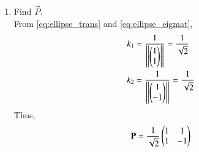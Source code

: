 \documentclass[journal,12pt,twocolumn]{IEEEtran}
\renewcommand\thesection{\arabic{section}}
\begin{document}
\begin{enumerate}[label=\thesection.\arabic*
,ref=\thesection.\theenumi]
\\
\solution From \eqref{eq:ellipse_eig}
\begin{align}
V\vec{P}_1 &= \lambda_1 \vec{P}_1
\\
\implies \brak{V-\lambda I} \vec{y}&= 0
\\
\implies \myvec{1 & -1} \vec{P}_1&= 0
\\
\text{or, } \vec{P}_1 = k_1 \myvec{1 \\ 1}
\label{eq:ellipsen1}
\end{align}
%
Similarly, 
%
\begin{align}
\myvec{1 &  1}\vec{P}_2&= 0
\\
\text{or, } \vec{P}_2 = k_2 \myvec{1 \\ -1}
\end{align}
%
\item Find $\vec{P}$.
\\
\solution From \eqref{eq:ellipse_trans} and \eqref{eq:ellipse_eigmat},
\begin{align}
k_1 &=  \frac{1}{\left\lVert\begin{pmatrix}1 \\ 1\end{pmatrix}\right\rVert} = \frac{1}{\sqrt{2}}
\\
k_2 &=  \frac{1}{\left\lVert\begin{pmatrix}1 \\ -1\end{pmatrix}\right\rVert} = \frac{1}{\sqrt{2}}
\end{align}
%
Thus,
\begin{align}
\mathbf{P} = \frac{1}{\sqrt{2}}\begin{pmatrix}1 & 1 \\ 1 & -1\end{pmatrix}
\end{align}


\end{enumerate}
\end{document}
